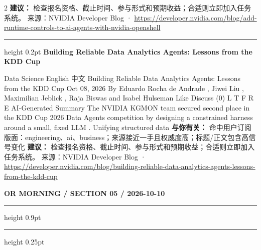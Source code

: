 \documentclass[10.5pt]{ctexart}
\begin{document}
\begin{multicols}{2}
\textbf{建议：} 检查报名资格、截止时间、参与形式和预期收益；合适则立即加入任务系统。
{\footnotesize\color{ormuted} 来源：NVIDIA Developer Blog · \url{https://developer.nvidia.com/blog/add-runtime-controls-to-ai-agents-with-nvidia-openshell}}
\vspace{2mm}
\hrule height 0.2pt
\vspace{2mm}
{\large\bfseries Building Reliable Data Analytics Agents: Lessons from the KDD Cup}\par
Data Science English 中文 Building Reliable Data Analytics Agents: Lessons from the KDD Cup Oct 08, 2026 By Eduardo Rocha de Andrade , Jiwei Liu , Maximilian Jeblick , Raja Biswas and Isabel Hulseman Like Discuss (0) L T F R E AI-Generated Summary The NVIDIA KGMON team secured second place in the KDD Cup 2026 Data Agents competition by designing a constrained harness around a small, fixed LLM . Unifying structured data
\textbf{与你有关：} 命中用户订阅版面：engineering、ai、business；来源接近一手且权威度高；标题/正文包含高信号变化
\textbf{建议：} 检查报名资格、截止时间、参与形式和预期收益；合适则立即加入任务系统。
{\footnotesize\color{ormuted} 来源：NVIDIA Developer Blog · \url{https://developer.nvidia.com/blog/building-reliable-data-analytics-agents-lessons-from-the-kdd-cup}}
\end{multicols}
\newpage
{\small\bfseries OR MORNING / SECTION 05 / 2026-10-10}
\vspace{2mm}
\hrule height 0.9pt
\vspace{1.5mm}
\hrule height 0.25pt
\vspace{4mm}
\end{document}
